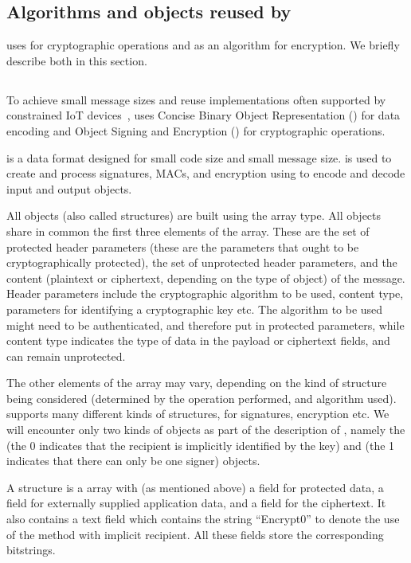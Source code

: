 {\subsection{Algorithms and objects reused by \mEdhoc{}}
\mEdhoc{} uses \mCose{} for cryptographic operations and \mAead{} as an algorithm for encryption. We briefly describe both in this section.

\subsection{\mCose}
To achieve small message sizes and reuse implementations often supported by constrained IoT devices~\cite{Lorawan1,Lorawan2}, \mEdhoc{} uses Concise Binary Object Representation (\mCbor) for data encoding and \mCbor{} Object Signing and Encryption (\mCose) for cryptographic operations.

\mCbor{} is a data format designed for small code size and small message size. \mCose{} is used to create and process signatures, MACs, and encryption using \mCbor{} to encode and decode input and output objects.

All \mCose{} objects (also called structures) are built using the \mCbor{} array type. All objects share in common the first three elements of the array. These are the set of protected header parameters (these are the parameters that ought to be cryptographically protected), the set of unprotected header parameters, and the content (plaintext or ciphertext, depending on the type of \mCose{} object) of the message. Header parameters include the cryptographic algorithm to be used, content type, parameters for identifying a cryptographic key etc. The algorithm to be used might need to be authenticated, and therefore put in protected parameters, while content type indicates the type of data in the payload or ciphertext fields, and can remain unprotected.

The other elements of the \mCbor{} array may vary, depending on the kind of \mCose{} structure being considered (determined by the operation performed, and algorithm used). \mCose{} supports many different kinds of structures, for signatures, encryption etc. We will encounter only two kinds of \mCose{} objects as part of the description of \mEdhoc, namely the \mCoseEncrypt{} (the 0 indicates that the recipient is implicitly identified by the key) and \mCoseSign{} (the 1 indicates that there can only be one signer) objects.

A \mCoseEncrypt{} structure is a \mCbor{} array with (as mentioned above) a field for protected data, a field for externally supplied application data, and a field for the ciphertext. It also contains a text field which contains the string ``Encrypt0'' to denote the use of the method with implicit recipient. All these fields store the corresponding bitstrings.

}
